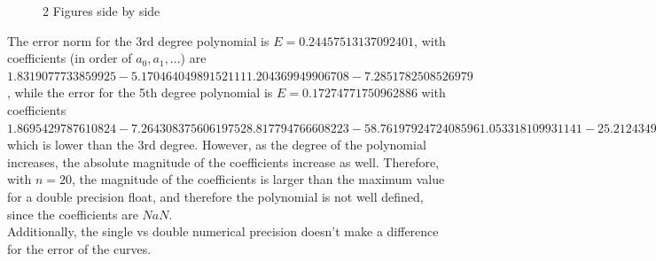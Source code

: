 \documentclass{article}
\begin{document}
\begin{figure}[H]
    \centering
    \qquad
    \caption{2 Figures side by side}%
    \label{3rd ad 5th degree fitting polynomials, single precision}%
\end{figure}

The error norm for the 3rd degree polynomial is $E=0.24457513137092401$, with coefficients (in order of $a_0, a_1,...$) are $1.8319077733859925       -5.1704640498915211        11.204369949906708       -7.2851782508526979$, while the error for the 5th degree polynomial is $E=0.17274771750962886$ with coefficients $1.8695429787610824       -7.2643083756061975        28.817794766608223       -58.761979247240859        61.053318109931141       -25.212434983094763$ which is lower than the 3rd degree. However, as the degree of the polynomial increases, the absolute magnitude of the coefficients increase as well. Therefore, with $n=20$, the magnitude of the coefficients is larger than the maximum value for a double precision float, and therefore the polynomial is not well defined, since the coefficients are $NaN$. \\

Additionally, the single vs double numerical precision doesn't make a difference for the error of the curves. \\
\end{document}
